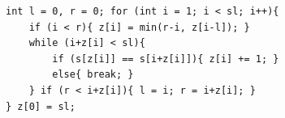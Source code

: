 \begin{verbatim}
int l = 0, r = 0; for (int i = 1; i < sl; i++){
	if (i < r){ z[i] = min(r-i, z[i-l]); }
	while (i+z[i] < sl){
		if (s[z[i]] == s[i+z[i]]){ z[i] += 1; }
		else{ break; }
	} if (r < i+z[i]){ l = i; r = i+z[i]; }
} z[0] = sl;
\end{verbatim}